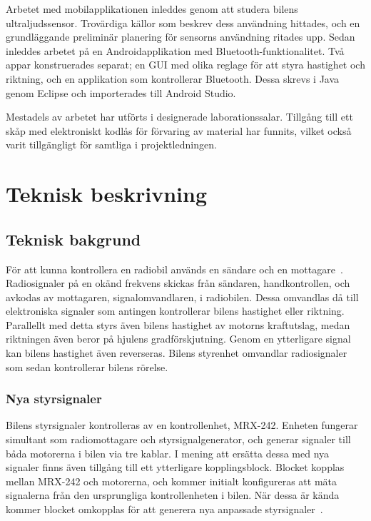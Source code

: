 \documentclass[a4paper]{article}
\begin{document}
\vspace{5mm} \noindent
Arbetet med mobilapplikationen inleddes genom att studera bilens ultraljudssensor. Trovärdiga källor som beskrev dess användning hittades, och en grundläggande preliminär planering för sensorns användning ritades upp. Sedan inleddes arbetet på en Androidapplikation med Bluetooth-funktionalitet.
Två appar konstruerades separat; en GUI med olika reglage för att styra hastighet och riktning, och en applikation som kontrollerar Bluetooth. Dessa skrevs i Java genom Eclipse och importerades till Android Studio.

\vspace{5mm} \noindent
Mestadels av arbetet har utförts i designerade laborationssalar. Tillgång till ett skåp med elektroniskt kodlås för förvaring av material har funnits, vilket också varit tillgängligt för samtliga i projektledningen.

\section{Teknisk beskrivning}

\subsection{Teknisk bakgrund}
För att kunna kontrollera en radiobil används en sändare och en mottagare~\cite{RCTechnique}. Radiosignaler på en okänd frekvens skickas från sändaren, handkontrollen, och avkodas av mottagaren, signalomvandlaren, i radiobilen. Dessa omvandlas då till elektroniska signaler som antingen kontrollerar bilens hastighet eller riktning. Parallellt med detta styrs även bilens hastighet av motorns kraftutslag, medan riktningen även beror på hjulens gradförskjutning. Genom en ytterligare signal kan bilens hastighet även reverseras. Bilens styrenhet omvandlar radiosignaler som sedan kontrollerar bilens rörelse.

\subsubsection{Nya styrsignaler}
Bilens styrsignaler kontrolleras av en kontrollenhet, MRX-242. Enheten fungerar simultant som radiomottagare och styrsignalgenerator, och generar signaler till båda motorerna i bilen via tre kablar. I mening att ersätta dessa med nya signaler finns även tillgång till ett ytterligare kopplingsblock. Blocket kopplas mellan MRX-242 och motorerna, och kommer initialt konfigureras att mäta signalerna från den ursprungliga kontrollenheten i bilen. När dessa är kända kommer blocket omkopplas för att generera nya anpassade styrsignaler~\cite{projektDir}. 
\end{document}
